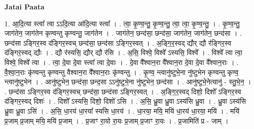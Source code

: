 \documentclass[17pt]{extarticle}
\begin{document}
\textbf{Jatai Paata} \newline

1. आ॒दि॒त्या स्त्वा᳚ त्वा ऽऽदि॒त्या आ॑दि॒त्या स्त्वा᳚ । . त्वा॒ कृ॒ण्व॒न्तु॒ कृ॒ण्व॒न्तु॒ त्वा॒ त्वा॒ कृ॒ण्व॒न्तु॒ । . कृ॒ण्व॒न्तु॒ जाग॑तेन॒ जाग॑तेन कृण्वन्तु कृण्वन्तु॒ जाग॑तेन । . जाग॑तेन॒ छन्द॑सा॒ छन्द॑सा॒ जाग॑तेन॒ जाग॑तेन॒ छन्द॑सा । . छन्द॑सा ऽङ्गिर॒स्व द॑ङ्गिर॒स्वच् छन्द॑सा॒ छन्द॑सा ऽङ्गिर॒स्वत् । . अ॒ङ्गि॒र॒स्वद् द्यौर् द्यौ र॑ङ्गिर॒स्व द॑ङ्गिर॒स्वद् द्यौः । . द्यौ र॑स्यसि॒ द्यौर् द्यौ र॑सि । . अ॒सि॒ विश्वे॒ विश्वे᳚ ऽस्यसि॒ विश्वे᳚ । . विश्वे᳚ त्वा त्वा॒ विश्वे॒ विश्वे᳚ त्वा । . त्वा॒ दे॒वा दे॒वा स्त्वा᳚ त्वा दे॒वाः । . दे॒वा वै᳚श्वान॒रा वै᳚श्वान॒रा दे॒वा दे॒वा वै᳚श्वान॒राः । . वै॒श्वा॒न॒राः कृ॑ण्वन्तु कृण्वन्तु वैश्वान॒रा वै᳚श्वान॒राः कृ॑ण्वन्तु । . कृ॒ण्व॒ न्त्वानु॑ष्टुभे॒ना नु॑ष्टुभेन कृण्वन्तु कृण्व॒ न्त्वानु॑ष्टुभेन । . आनु॑ष्टुभेन॒ छन्द॑सा॒ छन्द॒सा ऽऽनु॑ष्टुभे॒ना नु॑ष्टुभेन॒ छन्द॑सा । . आनु॑ष्टुभे॒नेत्यानु॑ - स्तु॒भे॒न॒ । . छन्द॑सा ऽङ्गिर॒स्व द॑ङ्गिर॒स्वच् छन्द॑सा॒ छन्द॑सा ऽङ्गिर॒स्वत् । . अ॒ङ्गि॒र॒स्वद् दिशो॒ दिशो᳚ ऽङ्गिर॒स्व द॑ङ्गिर॒स्वद् दिशः॑ । . दिशो᳚ ऽस्यसि॒ दिशो॒ दिशो॑ ऽसि । . अ॒सि॒ ध्रु॒वा ध्रु॒वा ऽस्य॑सि ध्रु॒वा । . ध्रु॒वा ऽस्य॑सि ध्रु॒वा ध्रु॒वा ऽसि॑ । . अ॒सि॒ धा॒रय॑ धा॒रया᳚ स्यसि धा॒रय॑ । . धा॒रया॒ मयि॒ मयि॑ धा॒रय॑ धा॒रया॒ मयि॑ । . मयि॑ प्र॒जाम् प्र॒जाम् मयि॒ मयि॑ प्र॒जाम् । . प्र॒जाꣳ रा॒यो रा॒यः प्र॒जाम् प्र॒जाꣳ रा॒यः । . प्र॒जामिति॑ प्र - जाम् । \newline
\end{document}
